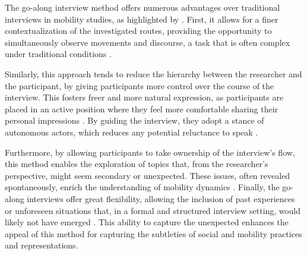 \begin{refsegment}
The go-along interview method offers numerous advantages over traditional interviews in mobility studies, as highlighted by \textcolor{blue}{\textcite[3]{despres_replacer_2019}}. First, it allows for a finer contextualization of the investigated routes, providing the opportunity to simultaneously observe movements and discourse, a task that is often complex under traditional conditions \textcolor{blue}{\autocite[119]{bergeron_uncovering_2014}}.%

Similarly, this approach tends to reduce the hierarchy between the researcher and the participant, by giving participants more control over the course of the interview. This fosters freer and more natural expression, as participants are placed in an active position where they feel more comfortable sharing their personal impressions \textcolor{blue}{\autocite[120]{bergeron_uncovering_2014}}. By guiding the interview, they adopt a stance of autonomous actors, which reduces any potential reluctance to speak \textcolor{blue}{\autocites[264]{carpiano_come_2009}[850]{evans_walking_2011}}.%

Furthermore, by allowing participants to take ownership of the interview's flow, this method enables the exploration of topics that, from the researcher's perspective, might seem secondary or unexpected. These issues, often revealed spontaneously, enrich the understanding of mobility dynamics \textcolor{blue}{\autocite[463]{kusenbach_street_2003}}. Finally, the go-along interviews offer great flexibility, allowing the inclusion of past experiences or unforeseen situations that, in a formal and structured interview setting, would likely not have emerged \textcolor{blue}{\autocite[464]{kusenbach_street_2003}}. This ability to capture the unexpected enhances the appeal of this method for capturing the subtleties of social and mobility practices and representations.%


\end{refsegment}
